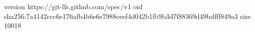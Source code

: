 version https://git-lfs.github.com/spec/v1
oid sha256:7a4142ccc6e176afb4b6e6e7988ceef4d042b1fb9b3d7f88369d49bdfff849a3
size 10018
